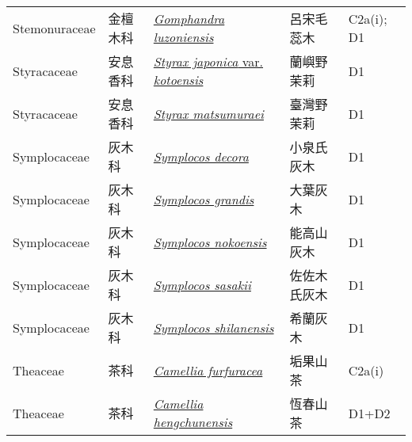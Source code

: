 {\begin{longtable}{p{2.5cm}p{2cm}p{5cm}p{2.5cm}p{3cm}}
    Stemonuraceae & 金檀木科 & \href{http://www.theplantlist.org/tpl1.1/search?q=Gomphandra+luzoniensis}{\textit{Gomphandra luzoniensis} } & 呂宋毛蕊木 & C2a(i); D1 \index{Gomphandra@\textit{Gomphandra}!luzoniensis@\textit{luzoniensis}}  \index{呂宋毛蕊木} \\
    Styracaceae & 安息香科 & \href{http://www.theplantlist.org/tpl1.1/search?q=Styrax+japonica+var.+kotoensis}{\textit{Styrax japonica} var. \textit{kotoensis} } & 蘭嶼野茉莉 & D1 \index{Styrax@\textit{Styrax}!japonica@\textit{japonica}!var. kotoensis@var. \textit{kotoensis}}  \index{蘭嶼野茉莉} \\
    Styracaceae & 安息香科 & \href{http://www.theplantlist.org/tpl1.1/search?q=Styrax+matsumuraei}{\textit{Styrax matsumuraei} } & 臺灣野茉莉 & D1 \index{Styrax@\textit{Styrax}!matsumuraei@\textit{matsumuraei}}  \index{臺灣野茉莉} \\
    Symplocaceae & 灰木科 & \href{http://www.theplantlist.org/tpl1.1/search?q=Symplocos+decora}{\textit{Symplocos decora} } & 小泉氏灰木 & D1 \index{Symplocos@\textit{Symplocos}!decora@\textit{decora}}  \index{小泉氏灰木} \\
    Symplocaceae & 灰木科 & \href{http://www.theplantlist.org/tpl1.1/search?q=Symplocos+grandis}{\textit{Symplocos grandis} } & 大葉灰木 & D1 \index{Symplocos@\textit{Symplocos}!grandis@\textit{grandis}}  \index{大葉灰木} \\
    Symplocaceae & 灰木科 & \href{http://www.theplantlist.org/tpl1.1/search?q=Symplocos+nokoensis}{\textit{Symplocos nokoensis} } & 能高山灰木 & D1 \index{Symplocos@\textit{Symplocos}!nokoensis@\textit{nokoensis}}  \index{能高山灰木} \\
    Symplocaceae & 灰木科 & \href{http://www.theplantlist.org/tpl1.1/search?q=Symplocos+sasakii}{\textit{Symplocos sasakii} } & 佐佐木氏灰木 & D1 \index{Symplocos@\textit{Symplocos}!sasakii@\textit{sasakii}}  \index{佐佐木氏灰木} \\
    Symplocaceae & 灰木科 & \href{http://www.theplantlist.org/tpl1.1/search?q=Symplocos+shilanensis}{\textit{Symplocos shilanensis} } & 希蘭灰木 & D1 \index{Symplocos@\textit{Symplocos}!shilanensis@\textit{shilanensis}}  \index{希蘭灰木} \\
    Theaceae & 茶科 & \href{http://www.theplantlist.org/tpl1.1/search?q=Camellia+furfuracea}{\textit{Camellia furfuracea} } & 垢果山茶 & C2a(i) \index{Camellia@\textit{Camellia}!furfuracea@\textit{furfuracea}}  \index{垢果山茶} \\
    Theaceae & 茶科 & \href{http://www.theplantlist.org/tpl1.1/search?q=Camellia+hengchunensis}{\textit{Camellia hengchunensis} } & 恆春山茶 & D1+D2 \index{Camellia@\textit{Camellia}!hengchunensis@\textit{hengchunensis}}  \index{恆春山茶} \\

\end{longtable}}

